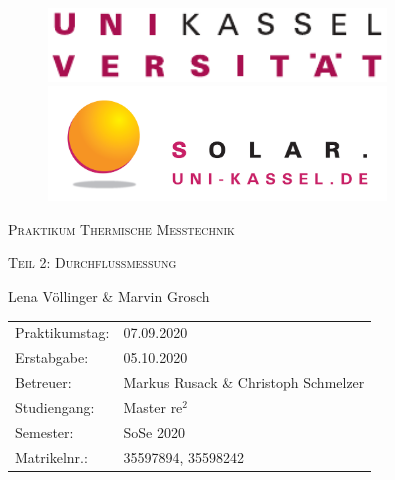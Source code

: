 \documentclass[10pt,a4paper,toc=listof,toc=bibliography]{scrartcl}
\begin{document}
	\begin{titlepage}
		
		\begin{figure}[H]
			\begin{minipage}{0.5\textwidth}
				\centering
				\includegraphics[width=0.8\textwidth]{../DATA/Logo_Uni-Kassel.pdf}
			\end{minipage}\hfill
			\begin{minipage}{0.5\textwidth}
				\centering
				\includegraphics[width=0.8\textwidth]{../DATA/Logo_solar.png}
			\end{minipage}
		\end{figure}
		
		\vspace{3cm}
		
		\centering
		{\scshape\LARGE Praktikum Thermische Messtechnik \par}   %
		\vspace{1cm}
		{\scshape\Large Teil 2: Durchflussmessung \par}
		\vspace{1.5cm}
		\vspace{2cm}
		{\Large Lena Völlinger \& Marvin Grosch\par}
		\vfill
		
		\begin{large}
			\begin{tabular}{l l}
				
				Praktikumstag: & 07.09.2020 \\
				Erstabgabe: & 05.10.2020\\
				Betreuer: & Markus Rusack \& Christoph Schmelzer\\
				Studiengang: & Master $\text{re}^2$\\
				Semester: & SoSe 2020\\
				Matrikelnr.: & 35597894, 35598242\\ 
			\end{tabular}
		\end{large}
		
	\end{titlepage}
	
\end{document}
